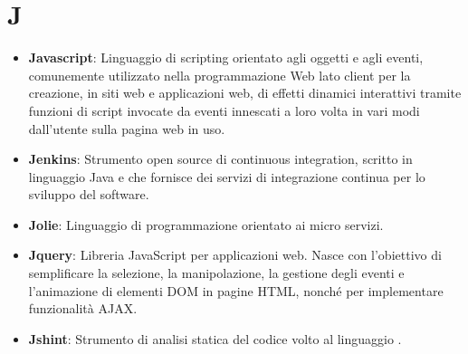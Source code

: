 \section{J}
\begin{itemize}
	\item
	\textbf{Javascript}: Linguaggio di scripting orientato agli oggetti e agli eventi, comunemente utilizzato nella programmazione Web lato client per la creazione, in siti web e applicazioni web, di effetti dinamici interattivi tramite funzioni di script invocate da eventi innescati a loro volta in vari modi dall'utente sulla pagina web in uso.
	\item
	\textbf{Jenkins}: Strumento open source di continuous integration, scritto in linguaggio Java e che fornisce dei servizi di integrazione continua per lo sviluppo del software.
	\item
	\textbf{Jolie}: Linguaggio di programmazione orientato ai micro servizi.
	\item
	\textbf{Jquery}: Libreria JavaScript per applicazioni web. Nasce con l'obiettivo di semplificare la selezione, la manipolazione, la gestione degli eventi e l'animazione di elementi DOM in pagine HTML, nonché per implementare funzionalità AJAX.
	\item
	\textbf{Jshint}: Strumento di analisi statica del codice volto al linguaggio .
\end{itemize}
\newpage